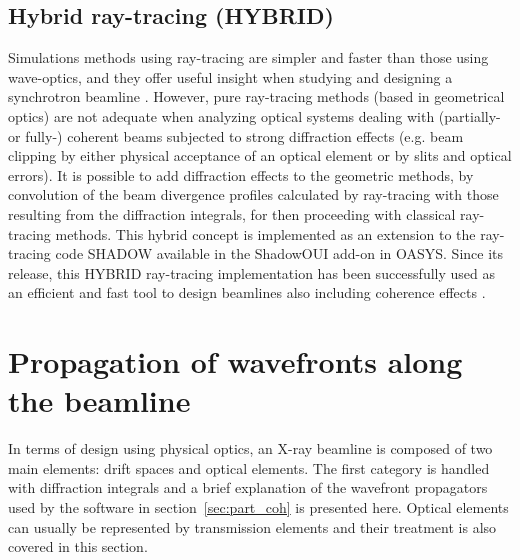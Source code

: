 \documentclass[preprint]{iucr}
\newcommand{\inred}[1]{{\color{red}#1}}
\begin{document}
\subsection{Hybrid ray-tracing (HYBRID)}

Simulations methods using ray-tracing are simpler and faster than those using wave-optics, and they offer useful insight when studying and designing a synchrotron beamline \cite{hierarchical}. However, pure ray-tracing methods \inred{(}based in geometrical optics\inred{)} are not adequate when analyzing optical systems dealing with (partially- or fully-) coherent beams subjected to strong diffraction effects (e.g. beam clipping by either physical acceptance of an optical element or by slits and optical errors). It is possible to add diffraction effects to the geometric methods, by convolution of the beam divergence profiles calculated by ray-tracing with those resulting from the diffraction integrals, for then proceeding with classical ray-tracing methods. This hybrid concept \cite{codeHYBRID} is implemented as an extension to the ray-tracing code SHADOW \cite{codeSHADOW} available in the ShadowOUI \cite{codeSHADOWOUI} add-on in OASYS. Since its release, this HYBRID ray-tracing implementation has been successfully used as an efficient and fast tool to design beamlines also including coherence effects \cite{Shi2017,Luca2020, Lordano2022}.

\section{Propagation of wavefronts along the beamline\\}\label{sec:propagation}

 In terms of design using physical optics, an X-ray beamline is composed of two main elements: drift spaces and optical elements. The first category is handled with diffraction integrals and a brief explanation of the wavefront propagators used by the software in section~\ref{sec:part_coh} is presented here. Optical elements can usually be represented by transmission elements and their treatment is also covered in this section. 
\end{document}
